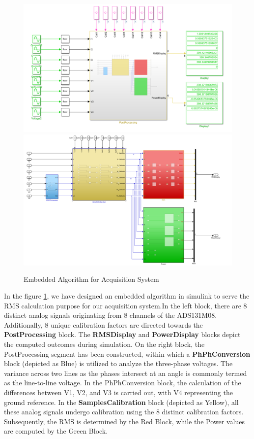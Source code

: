 \par
\begin{figure}[htbp]
\centering
\includegraphics[scale=0.33]{images/Feature Extraction.png}
\includegraphics[scale=0.33]{images/PostProcessing.png}
\caption{Embedded Algorithm for Acquisition System}
\label{fig:x Embedded Algorithm}
\end{figure}

In the figure \ref{fig:x Embedded Algorithm}, we have designed an embedded algorithm in simulink to serve the RMS calculation purpose for our acquisition system.In the left block, there are 8 distinct analog signals originating from 8 channels of the ADS131M08. Additionally, 8 unique calibration factors are directed towards the \textbf{PostProcessing } block. The \textbf{RMSDisplay} and \textbf{PowerDisplay} blocks depict the computed outcomes during simulation. On the right block, the PostProcessing segment has been constructed, within which a \textbf{PhPhConversion} block (depicted as Blue) is utilized to analyze the three-phase voltages. The variance across two lines as the phases intersect at an angle is commonly termed as the line-to-line voltage. In the PhPhConversion block, the calculation of the differences between V1, V2, and V3 is carried out, with V4 representing the ground reference.
In the \textbf{SamplesCalibration} block (depicted as Yellow), all these analog signals undergo calibration using the 8 distinct calibration factors. Subsequently, the RMS is determined by the Red Block, while the Power values are computed by the Green Block.\par
\vspace{0.5cm}

